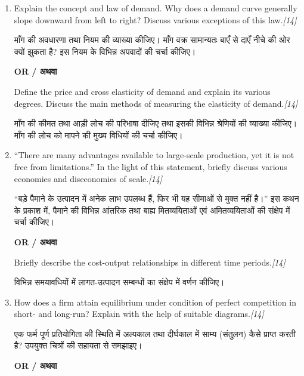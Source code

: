\documentclass[11pt,a4paper]{article}
\newcommand{\pts}[1]{\hfill \textit{[#1]}}
\begin{document}
\begin{enumerate}[label=\textbf{\arabic*.},leftmargin=*,itemsep=14pt]

  \item Explain the concept and law of demand. Why does a demand curve generally slope downward from left to right? Discuss various exceptions of this law.\pts{14}
  
  माँग की अवधारणा तथा नियम की व्याख्या कीजिए। माँग वक्र सामान्यतः बाएँ से दाएँ नीचे की ओर क्यों झुकता है? इस नियम के विभिन्न अपवादों की चर्चा कीजिए।

  \begin{center}\textbf{OR / अथवा}\end{center}

  Define the price and cross elasticity of demand and explain its various degrees. Discuss the main methods of measuring the elasticity of demand.\pts{14}
  
  माँग की कीमत तथा आड़ी लोच की परिभाषा दीजिए तथा इसकी विभिन्न श्रेणियों की व्याख्या कीजिए। माँग की लोच को मापने की मुख्य विधियों की चर्चा कीजिए।

  \item ``There are many advantages available to large-scale production, yet it is not free from limitations.'' In the light of this statement, briefly discuss various economies and diseconomies of scale.\pts{14}
  
  ``बड़े पैमाने के उत्पादन में अनेक लाभ उपलब्ध हैं, फिर भी यह सीमाओं से मुक्त नहीं है।'' इस कथन के प्रकाश में, पैमाने की विभिन्न आंतरिक तथा बाह्य मितव्ययिताओं एवं अमितव्ययिताओं की संक्षेप में चर्चा कीजिए।

  \begin{center}\textbf{OR / अथवा}\end{center}

  Briefly describe the cost-output relationships in different time periods.\pts{14}
  
  विभिन्न समयावधियों में लागत-उत्पादन सम्बन्धों का संक्षेप में वर्णन कीजिए।

  \item How does a firm attain equilibrium under condition of perfect competition in short- and long-run? Explain with the help of suitable diagrams.\pts{14}
  
  एक फर्म पूर्ण प्रतियोगिता की स्थिति में अल्पकाल तथा दीर्घकाल में साम्य (संतुलन) कैसे प्राप्त करती है? उपयुक्त चित्रों की सहायता से समझाइए।

  \begin{center}\textbf{OR / अथवा}\end{center}


\end{enumerate}
\end{document}
